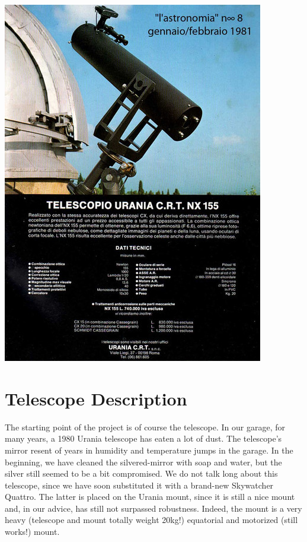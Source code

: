 \documentclass{article}
\begin{document}
    \begin{multicols}{2}

        \tableofcontents

        \begin{minipage}{0.5\textwidth}
            \centering
            \includegraphics[scale=0.4]{urania_upper.jpg}
            \label{fig:urania_telescope_mount}
        \end{minipage}

        \section{Telescope Description}
        The starting point of the project is of course the telescope.
        In our garage, for many years, a 1980 Urania telescope has eaten a lot of dust.
        The telescope's mirror resent of years in humidity and temperature jumps in the garage.
        In the beginning, we have cleaned the silvered-mirror with soap and water, but the silver still seemed to be a bit compromised.
        We do not talk long about this telescope, since we have soon substituted it with a brand-new Skywatcher Quattro.
        The latter is placed on the Urania mount, since it is still a nice mount and, in our advice, has still not surpassed robustness.
        Indeed, the mount is a very heavy (telescope and mount totally weight 20kg!) equatorial and motorized (still works!) mount.
        

\end{multicols}
\end{document}
